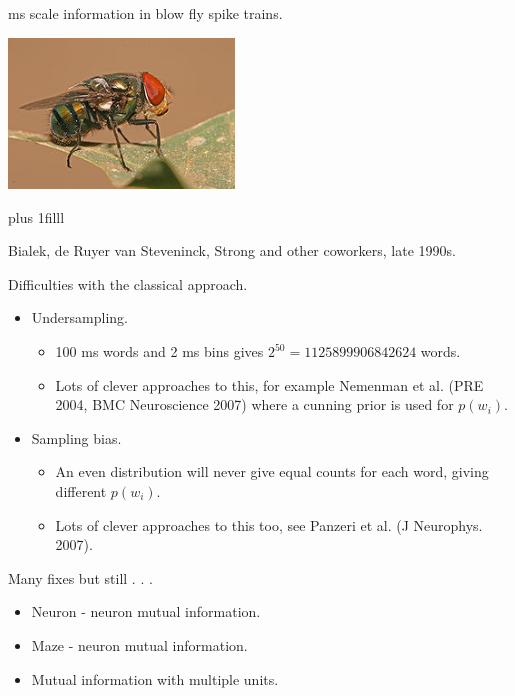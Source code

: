 \documentclass{beamer}
\newcommand{\btVFill}{\vskip0pt plus 1filll}
\begin{document}
\begin{frame}{ms scale information in blow fly spike trains.}
\begin{center}
\includegraphics[width=6cm]{blow_fly.jpg}
\end{center}
\btVFill
\begin{flushright}
\tiny{Bialek, de Ruyer van Steveninck, Strong and other coworkers, late 1990s.}
\end{flushright}
\end{frame}



\begin{frame}{Difficulties with the classical approach.}
\begin{itemize}
\item Undersampling. 
\begin{itemize}
\item 100 ms words and 2 ms bins gives $2^{50}=1125899906842624$ words.
\item Lots of clever approaches to this, for example Nemenman et al. (PRE 2004, BMC Neuroscience 2007) where a cunning prior is used for $p(w_i)$.
\end{itemize}
\item Sampling bias.
\begin{itemize}
\item An even distribution will never give equal counts for each word,
  giving different $p(w_i)$.
\item Lots of clever approaches to this too, see Panzeri et al. (J Neurophys. 2007).
\end{itemize}
\end{itemize}
\end{frame}

\begin{frame}{Many fixes but still . . . }
\begin{itemize}
\item Neuron - neuron mutual information.
\item Maze - neuron mutual information.
\item Mutual information with multiple units.
\end{itemize}
\end{frame}
\end{document}
